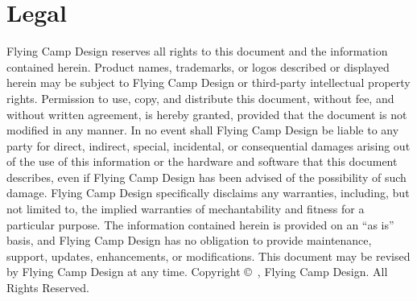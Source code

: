 \section*{Legal}

\begin{flushleft}
Flying Camp Design reserves all rights to this document and the information
contained herein.  Product names, trademarks, or logos described or
displayed herein may be subject to Flying Camp Design or third-party
intellectual property rights.  Permission to use, copy, and distribute
this document, without fee, and without written agreement, is hereby
granted, provided that the document is not modified in any manner.
\newline
\newline
In no event shall Flying Camp Design be liable to any party for direct,
indirect, special, incidental, or consequential damages arising out of
the use of this information or the hardware and software that this
document describes, even if Flying Camp Design has been advised of the
possibility of such damage.
\newline
\newline
Flying Camp Design specifically disclaims any warranties, including, but not
limited to, the implied warranties of mechantability and fitness for a
particular purpose.  The information contained herein is provided on
an ``as is'' basis, and Flying Camp Design has no obligation to provide
maintenance, support, updates, enhancements, or modifications.  This
document may be revised by Flying Camp Design at any time.
\newline
\newline
Copyright \copyright~\the\year, Flying Camp Design.  All Rights Reserved.
\end{flushleft}
